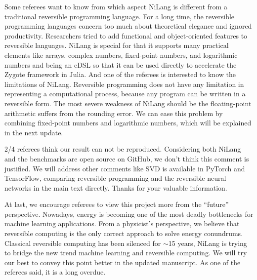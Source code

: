 \documentclass{article}
\begin{document}
Some referees want to know from which aspect NiLang is different from a traditional reversible programming language.
For a long time, the reversible programming languages concern too much about theoretical elegance and ignored productivity. Researchers tried to add functional and object-oriented features to reversible languages.
NiLang is special for that it supports many practical elements like arrays, complex numbers, fixed-point numbers, and logarithmic numbers and being an eDSL so that it can be used directly to accelerate the Zygote framework in Julia.
And one of the referees is interested to know the limitations of NiLang. Reversible programming does not have any limitation in representing a computational process, because any program can be written in a reversible form. The most severe weakness of NiLang should be the floating-point arithmetic suffers from the rounding error.
We can ease this problem by combining fixed-point numbers and logarithmic numbers, which will be explained in the next update.

2/4 referees think our result can not be reproduced. Considering both NiLang and the benchmarks are open source on GitHub, we don't think this comment is justified.
We will address other comments like SVD is available in PyTorch and TensorFlow,
comparing reversible programming and the reversible neural networks in the main text directly. Thanks for your valuable information.

At last, we encourage referees to view this project more from the ``future'' perspective.
Nowadays, energy is becoming one of the most deadly bottlenecks for machine learning applications.
From a physicist's perspective, we believe that reversible computing is the only correct approach to solve energy conundrums.
Classical reversible computing has been silenced for $\sim$15 years, NiLang is trying to bridge the new trend machine learning and reversible computing.
We will try our best to convey this point better in the updated manuscript. As one of the referees said, it is a long overdue.
\end{document}
